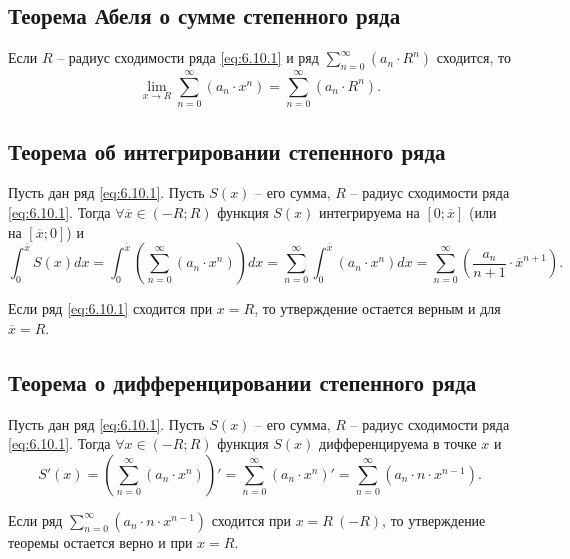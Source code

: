 \subsection{Теорема Абеля о сумме степенного ряда}

\begin{theorem}
    Если $R$ -- радиус сходимости ряда \ref{eq:6.10.1} и ряд $\sum_{n=0}^{\infty}(a_n \cdot R^n)$ сходится, то
    \[
        \underset{x\rightarrow R}{\lim}\sum_{n=0}^{\infty}(a_n \cdot x^n) = \sum_{n=0}^{\infty} (a_n \cdot R^n).
    \]
\end{theorem}

\subsection{Теорема об интегрировании степенного ряда}

\begin{theorem}
    Пусть дан ряд \ref{eq:6.10.1}. Пусть $S(x)$ -- его сумма, $R$ -- радиус сходимости ряда \ref{eq:6.10.1}. Тогда $\forall \overline{x} \in (-R;R)$ функция $S(x)$ интегрируема на $[0;\overline{x}]$ (или на $[\overline{x};0]$) и
    \[
        \int_{0}^{\overline{x}}S(x)dx = \int_{0}^{\overline{x}}\left(\sum_{n=0}^{\infty}(a_n \cdot x^n)\right)dx = \sum_{n=0}^{\infty}\int_{0}^{\overline{x}}(a_n \cdot x^n)dx = \sum_{n=0}^{\infty} \left(\frac{a_n}{n+1}\cdot \overline{x}^{n+1}\right).
    \]

    Если ряд \ref{eq:6.10.1} сходится при $x = R$, то утверждение остается верным и для $\overline{x} = R$.
\end{theorem}

\subsection{Теорема о дифференцировании степенного ряда}

\begin{theorem}
    Пусть дан ряд \ref{eq:6.10.1}. Пусть $S(x)$ -- его сумма, $R$ -- радиус сходимости ряда \ref{eq:6.10.1}. Тогда $\forall x \in (-R;R)$ функция $S(x)$ дифференцируема в точке $x$ и
    \[
        S'(x) = \left(\sum_{n=0}^{\infty}(a_n \cdot x^n)\right)' = \sum_{n=0}^{\infty}(a_n \cdot x^n)' = \sum_{n=0}^{\infty}(a_n \cdot n \cdot x^{n-1}).
    \]

    Если ряд $\sum_{n=0}^{\infty}(a_n \cdot n \cdot x^{n-1})$ сходится при $x = R \ (-R)$, то утверждение теоремы остается верно и при $x = R$.
\end{theorem}

